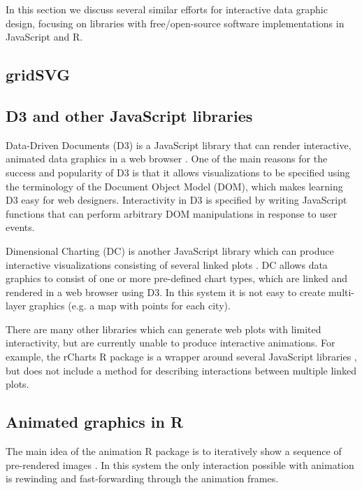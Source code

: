 \documentclass[journal]{vgtc}\usepackage[]{graphicx}\usepackage[]{color}
\begin{document}
In this section we discuss several similar efforts
for interactive data graphic design, focusing on libraries with
free/open-source software implementations in JavaScript and R.

\subsection{gridSVG}




\subsection{D3 and other JavaScript libraries}

Data-Driven Documents (D3) is a JavaScript library that can render
interactive, animated data graphics in a web browser \citep{d3}. One
of the main reasons for the success and popularity of D3 is that it
allows visualizations to be specified using the terminology of the
Document Object Model (DOM), which makes learning D3 easy for web
designers. Interactivity in D3 is specified by writing JavaScript
functions that can perform arbitrary DOM manipulations in response to
user events.

Dimensional Charting (DC) is another JavaScript library which can
produce interactive visualizations consisting of several linked plots
\citep{dc}. DC allows data graphics to consist of one or more
pre-defined chart types, which are linked and rendered in a web
browser using D3. In this system it is not easy to create multi-layer
graphics (e.g. a map with points for each city).

There are many other libraries which can generate web plots with
limited interactivity, but are currently unable to produce interactive
animations. For example, the rCharts R package is a wrapper around
several JavaScript libraries \citep{rcharts}, but does not include a
method for describing interactions between multiple linked
plots.

\subsection{Animated graphics in R}

The main idea of the animation R package is to iteratively show a
sequence of pre-rendered images \citep{animation}. In this system the
only interaction possible with animation is rewinding and
fast-forwarding through the animation frames.
\end{document}
